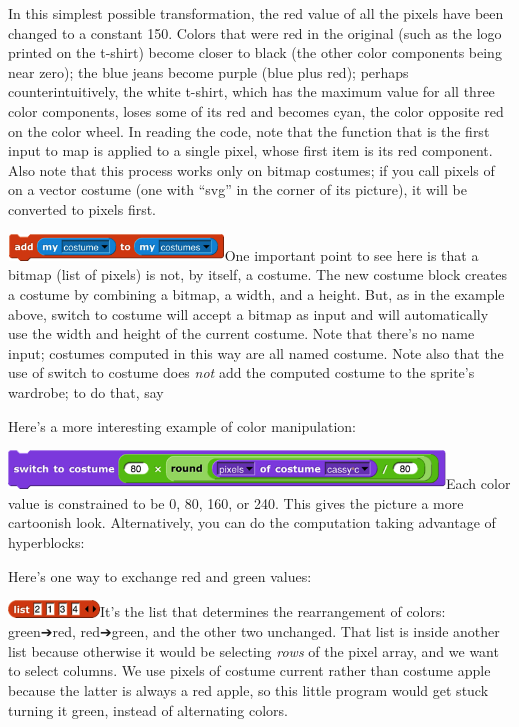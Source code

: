 In this simplest possible transformation, the red value of all the
pixels have been changed to a constant 150. Colors that were red in the
original (such as the logo printed on the t-shirt) become closer to
black (the other color components being near zero); the blue jeans
become purple (blue plus red); perhaps counterintuitively, the white
t-shirt, which has the maximum value for all three color components,
loses some of its red and becomes cyan, the color opposite red on the
color wheel. In reading the code, note that the function that is the
first input to map is applied to a single pixel, whose first item is its
red component. Also note that this process works only on bitmap
costumes; if you call pixels of on a vector costume (one with ``svg'' in
the corner of its picture), it will be converted to pixels first.

\includegraphics[width=2.25694in,height=0.28472in]{media/image790.png}One
important point to see here is that a bitmap (list of pixels) is not, by
itself, a costume. The new costume block creates a costume by combining
a bitmap, a width, and a height. But, as in the example above, switch to
costume will accept a bitmap as input and will automatically use the
width and height of the current costume. Note that there's no name
input; costumes computed in this way are all named costume. Note also
that the use of switch to costume does \emph{not} add the computed
costume to the sprite's wardrobe; to do that, say

Here's a more interesting example of color manipulation:

\includegraphics[width=4.5625in,height=0.40694in]{media/image797.png}Each
color value is constrained to be 0, 80, 160, or 240. This gives the
picture a more cartoonish look. Alternatively, you can do the
computation taking advantage of hyperblocks:

Here's one way to exchange red and green values:

\includegraphics[width=0.95833in,height=0.18056in]{media/image804.png}It's
the list that determines the rearrangement of colors: green➔red,
red➔green, and the other two unchanged. That list is inside another list
because otherwise it would be selecting \emph{rows} of the pixel array,
and we want to select columns. We use pixels of costume current rather
than costume apple because the latter is always a red apple, so this
little program would get stuck turning it green, instead of alternating
colors.

